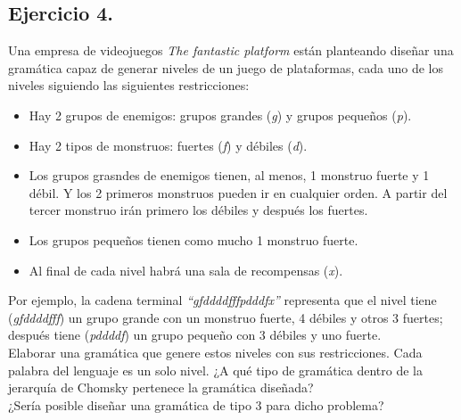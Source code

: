 \documentclass[11pt,a4paper]{article}
\begin{document}
\subsection{Ejercicio 4.} Una empresa de videojuegos \textit{The fantastic platform} están planteando diseñar una gramática capaz de generar niveles de un juego de plataformas, cada uno de los niveles siguiendo las siguientes restricciones:
	\begin{itemize}
		\item Hay 2 grupos de enemigos: grupos grandes (\textit{g}) y grupos pequeños (\textit{p}).
		\item Hay 2 tipos de monstruos: fuertes (\textit{f}) y débiles (\textit{d}).
		\item Los grupos grasndes de enemigos tienen, al menos, 1 monstruo fuerte y 1 débil. Y los 2 primeros monstruos pueden ir en cualquier orden. A partir del tercer monstruo irán primero los débiles y después los fuertes.
		\item Los grupos pequeños tienen como mucho 1 monstruo fuerte.
		\item Al final de cada nivel habrá una sala de recompensas (\textit{x}).
	\end{itemize}
	
Por ejemplo, la cadena terminal \textit{“gfddddfffpdddfx”} representa que el nivel tiene (\textit{gfddddfff}) un grupo grande con un monstruo fuerte, 4 débiles y otros 3 fuertes; después tiene (\textit{pddddf}) un grupo pequeño con 3 débiles y uno fuerte.\\

Elaborar una gramática que genere estos niveles con sus restricciones. Cada palabra del lenguaje es un solo nivel. ¿A qué tipo de gramática dentro de la jerarquía de Chomsky pertenece la gramática diseñada?\\

¿Sería posible diseñar una gramática de tipo 3 para dicho problema?\\
\end{document}

